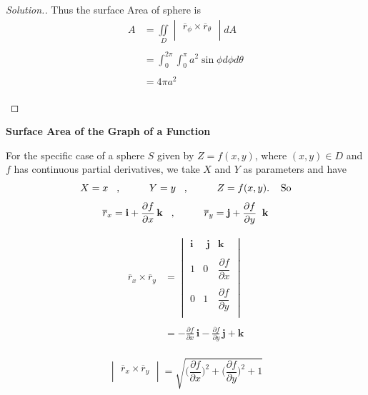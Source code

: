 \documentclass[11pt,a4paper]{article}
\theoremstyle{definition}
\newenvironment{solution}
  {\renewcommand{\qedsymbol}{}\begin{proof}[\textit{Solution}.]}
  {\end{proof}}
\newcommand{\subhead}[1]{%
  \par\medskip\noindent\textbf{#1}\par\nobreak\smallskip}
\begin{document}
\begin{solution}
Thus the surface Area of sphere is
\begin{align*}
A & = \iint\limits_D \begin{vmatrix}
\overline{r}_{\phi} \times \overline{r}_{\theta}\\
\end{vmatrix}dA\\\\
& = \int^{2\pi}_0\int^{\pi}_0 a^2\sin \phi d \phi d \theta\\\\
& = 4\pi a^2\\\\\\
\end{align*}
\end{solution}

\subhead{Surface Area of the Graph of a Function}


For the specific case of a sphere $S$ given by $Z = f(x,y)$, where $(x,y)\in D$ and $f$ has continuous partial derivatives, we take $X$ and $Y$ as parameters and have $$X=x\hspace{0.3cm}, \hspace{1cm} Y = y\hspace{0.3cm} , \hspace{1cm} Z = f(x,y).\hspace{0.4cm} \text{So}$$
$$\overline{r}_x = \textbf{i} + \frac{\partial f}{\partial x}\,\textbf{k}\hspace{0.3cm} ,\hspace{1cm} \overline{r}_y = \textbf{j} + \frac{\partial f}{\partial y}\,\textbf{ k}$$

\begin{align*}
\overline{r}_x\times\overline{r}_y  & = \begin{vmatrix}
\textbf{i} & \textbf{ j} & \textbf{k}\\\\
1 & 0 & \dfrac{\partial f}{\partial x}\\\\
0 & 1 & \dfrac{\partial f}{\partial y}\\
\end{vmatrix}\\\\
& = -\frac{\partial f}{\partial x}\,\textbf{i} - \frac{\partial f}{\partial y}\,\textbf{j} +\textbf{k}\\
\end{align*}

$$\begin{vmatrix}
\overline{r}_x \times \overline{r}_y\\
\end{vmatrix} = \sqrt{\Bigg(\dfrac{\partial f}{\partial x}\Bigg)^2 + \Bigg(\dfrac{\partial f}{\partial y}\Bigg)^2 + 1}$$
\end{document}
